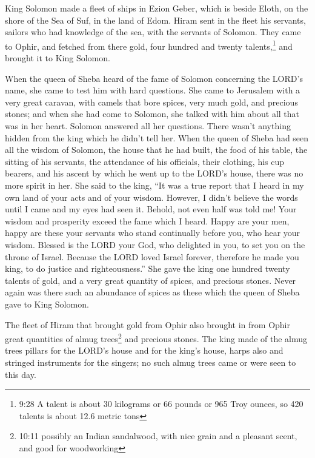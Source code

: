 \myverse{}King Solomon made a fleet of ships in Ezion Geber, which is beside
Eloth, on the shore of the Sea of Suf, in the land of Edom.
\myverse{}Hiram sent in the fleet his servants, sailors who had knowledge of the sea,
with the servants of Solomon.
\myverse{}They came to Ophir, and fetched from there gold, four hundred and twenty talents,\footnote{9:28 A talent is about 30 kilograms or 66 pounds or 965 Troy ounces, so 420 talents is about 12.6
	metric tons} and brought it to King Solomon.


\mychapter{} \myverse*{}When the queen of Sheba heard of the fame of Solomon concerning
the LORD’s name, she came to test him with hard questions.
\myverse{}She came to Jerusalem with a very great caravan, with camels that bore spices,
very much gold, and precious stones; and when she had come to Solomon, she talked with him about all that
was in her heart.
\myverse{}Solomon answered all her questions. There wasn’t anything hidden from the king
which he didn’t tell her.
\myverse{}When the queen of Sheba had seen all the wisdom of Solomon, the house that
he had built,
\myverse{}the food of his table, the sitting of his servants, the attendance of his officials,
their clothing, his cup bearers, and his ascent by which he went up to the LORD’s house, there was no
more spirit in her.
\myverse{}She said to the king, “It was a true report that I heard in my own land of
your acts and of your wisdom.
\myverse{}However, I didn’t believe the words until I came and my eyes had seen it. Behold,
not even half was told me! Your wisdom and prosperity exceed the fame which I heard.
\myverse{}Happy are your men, happy are these your servants who stand continually before
you, who hear your wisdom.
\myverse{}Blessed is the LORD your God, who delighted in you, to set you on the throne
of Israel. Because the LORD loved Israel forever, therefore he made you king, to do justice and righteousness.”
\myverse{}She gave the king one hundred twenty talents of gold, and a very great quantity
of spices, and precious stones. Never again was there such an abundance of spices as these which the queen
of Sheba gave to King Solomon.

\myverse{}The fleet of Hiram that brought gold from Ophir also brought
in from Ophir great quantities of almug trees\footnote{10:11 possibly an Indian sandalwood, with nice grain and a pleasant scent, and good for woodworking}
and precious stones.
\myverse{}The king made of the almug trees pillars for the LORD’s house and for the
king’s house, harps also and stringed instruments for the singers; no such almug trees came or were seen
to this day.

